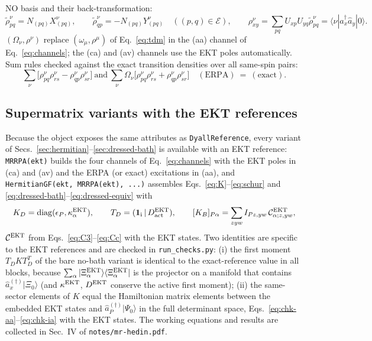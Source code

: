 \documentclass[11pt,a4paper]{article}
\newcommand{\ket}[1]{|#1\rangle}
\newcommand{\bra}[1]{\langle#1|}
\newcommand{\braket}[1]{\langle#1\rangle}
\newcommand{\code}[1]{\texttt{#1}}
\newcommand{\act}{\mathrm{act}}
\begin{document}
NO basis and their back-transformation:
\begin{equation}
  \tilde\rho^\nu_{pq}=N_{(pq)}X^\nu_{(pq)},\qquad
  \tilde\rho^\nu_{qp}=-N_{(pq)}Y^\nu_{(pq)}\quad((p,q)\in\mathcal E),\qquad
  \rho^\nu_{xy}=\sum_{pq}U_{xp}U_{yq}\tilde\rho^\nu_{pq}=\braket{\nu|\hat a_x^\dagger\hat a_y|0}.
  \label{eq:erpa-rho}
\end{equation}
$(\Omega_\nu,\rho^\nu)$ replace $(\omega_\mu,\rho^\mu)$ of Eq.~\eqref{eq:tdm}
in the (aa) channel of Eq.~\eqref{eq:channels}; the (ca) and (av) channels
use the EKT poles automatically.  Sum rules checked against the exact
transition densities over all same-spin pairs:
\begin{equation}
  \sum_\nu\bigl[\rho^\nu_{pq}\rho^\nu_{rs}-\rho^\nu_{qp}\rho^\nu_{sr}\bigr]
  \ \text{and}\
  \sum_\nu\Omega_\nu\bigl[\rho^\nu_{pq}\rho^\nu_{rs}+\rho^\nu_{qp}\rho^\nu_{sr}\bigr]
  \quad(\text{ERPA})\ =\ (\text{exact}).
  \label{eq:erpa-sumrules}
\end{equation}

\subsection{Supermatrix variants with the EKT references}
\label{sec:ekt-supermatrix}

Because the object exposes the same attributes as \code{DyallReference},
every variant of Secs.~\ref{sec:hermitian}--\ref{sec:dressed-bath} is available with
an EKT reference: \code{MRRPA(ekt)} builds the four channels of
Eq.~\eqref{eq:channels} with the EKT poles in (ca) and (av) and the ERPA
(or exact) excitations in (aa), and \code{HermitianGF(ekt, MRRPA(ekt), ...)}
assembles Eqs.~\eqref{eq:K}--\eqref{eq:schur} and
\eqref{eq:dressed-bath}--\eqref{eq:dressed-equiv} with
\begin{equation}
  K_D=\operatorname{diag}(\epsilon_P,\kappa^{\rm EKT}_{\alpha}),\qquad
  T_D=(\mathbf 1_{\rm i}\,|\,D^{\rm EKT}_{\act}),\qquad
  [K_B]_{P\alpha}=\sum_{zyw}I_{Pz,yw}\,\mathcal C^{\rm EKT}_{\alpha;z,yw},
  \label{eq:ekt-top}
\end{equation}
$\mathcal C^{\rm EKT}$ from Eqs.~\eqref{eq:C3}--\eqref{eq:Cc} with the EKT
states.  Two identities are specific to the EKT references and are checked in
\code{run\_checks.py}: (i) the first moment $T_DKT_D^{T}$ of the bare no-bath
variant is identical to the exact-reference value in all blocks, because
$\sum_\alpha\ket{\Xi^{\rm EKT}_\alpha}\bra{\Xi^{\rm EKT}_\alpha}$ is the projector on a
manifold that contains $\hat a_x^{(\dagger)}\ket{\Xi_0}$ (and $\kappa^{\rm EKT}$,
$D^{\rm EKT}$ conserve the active first moment); (ii) the same-sector
elements of $K$ equal the Hamiltonian matrix elements between the embedded
EKT states and $\hat a_P^{(\dagger)}\ket{\Psi_0}$ in the full determinant space,
Eqs.~\eqref{eq:chk-aa}--\eqref{eq:chk-ia} with the EKT states.  The working
equations and results are collected in Sec.~IV of \code{notes/mr-hedin.pdf}.
\end{document}
